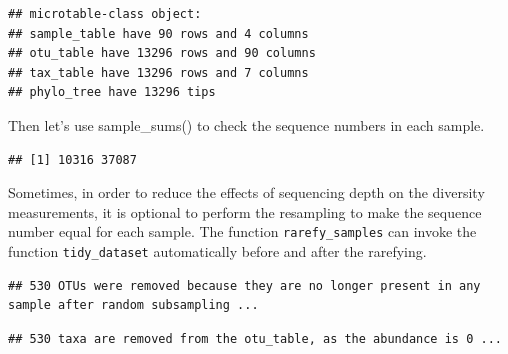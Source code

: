 \documentclass[
]{book}
\newenvironment{Shaded}{\begin{snugshade}}{\end{snugshade}}
\newcommand{\AttributeTok}[1]{\textcolor[rgb]{0.77,0.63,0.00}{#1}}
\newcommand{\CommentTok}[1]{\textcolor[rgb]{0.56,0.35,0.01}{\textit{#1}}}
\newcommand{\DecValTok}[1]{\textcolor[rgb]{0.00,0.00,0.81}{#1}}
\newcommand{\FunctionTok}[1]{\textcolor[rgb]{0.00,0.00,0.00}{#1}}
\newcommand{\NormalTok}[1]{#1}
\newcommand{\SpecialCharTok}[1]{\textcolor[rgb]{0.00,0.00,0.00}{#1}}
\begin{document}
\begin{verbatim}
## microtable-class object:
## sample_table have 90 rows and 4 columns
## otu_table have 13296 rows and 90 columns
## tax_table have 13296 rows and 7 columns
## phylo_tree have 13296 tips
\end{verbatim}

Then let's use sample\_sums() to check the sequence numbers in each sample.

\begin{Shaded}
\end{Shaded}

\begin{verbatim}
## [1] 10316 37087
\end{verbatim}

Sometimes, in order to reduce the effects of sequencing depth on the diversity measurements,
it is optional to perform the resampling to make the sequence number equal for each sample.
The function \texttt{rarefy\_samples} can invoke the function \texttt{tidy\_dataset} automatically before and after the rarefying.

\begin{Shaded}
\end{Shaded}

\begin{verbatim}
## 530 OTUs were removed because they are no longer present in any sample after random subsampling ...
\end{verbatim}

\begin{verbatim}
## 530 taxa are removed from the otu_table, as the abundance is 0 ...
\end{verbatim}

\begin{Shaded}
\end{Shaded}
\end{document}
